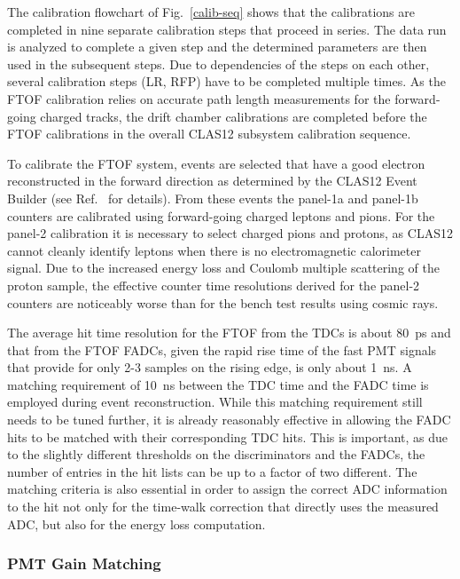 \documentclass[3p,times,twocolumn]{elsarticle}
\begin{document}
The calibration flowchart of Fig.~\ref{calib-seq} shows that the calibrations are completed in nine separate
calibration steps that proceed in series. The data run is analyzed to complete a given step and the determined
parameters are then used in the subsequent steps. Due to dependencies of the steps on each other, several
calibration steps (LR, RFP) have to be completed multiple times. As the FTOF calibration relies on accurate
path length measurements for the forward-going charged tracks, the drift chamber calibrations are completed
before the FTOF calibrations in the overall CLAS12 subsystem calibration sequence.

To calibrate the FTOF system, events are selected that have a good electron reconstructed in the forward
direction as determined by the CLAS12 Event Builder (see Ref.~\cite{recon-nim} for details). From these events
the panel-1a and panel-1b counters are calibrated using forward-going charged leptons and pions. For the panel-2
calibration it is necessary to select charged pions and protons, as CLAS12 cannot cleanly identify leptons when
there is no electromagnetic calorimeter signal. Due to the increased energy loss and Coulomb multiple scattering
of the proton sample, the effective counter time resolutions derived for the panel-2 counters are noticeably
worse than for the bench test results using cosmic rays.

The average hit time resolution for the FTOF from the TDCs is about 80~ps and that from the FTOF
FADCs, given the rapid rise time of the fast PMT signals that provide for only 2-3 samples on the rising
edge, is only about 1~ns. A matching requirement of 10~ns between the TDC time and the FADC time is
employed during event reconstruction. While this matching requirement still needs to be tuned further,
it is already reasonably effective in allowing the FADC hits to be matched with their corresponding TDC
hits. This is important, as due to the slightly different thresholds on the discriminators and the FADCs, the
number of entries in the hit lists can be up to a factor of two different. The matching criteria is also
essential in order to assign the correct ADC information to the hit not only for the time-walk correction
that directly uses the measured ADC, but also for the energy loss computation.

\subsubsection{PMT Gain Matching}
\label{gain-matching}
\end{document}
